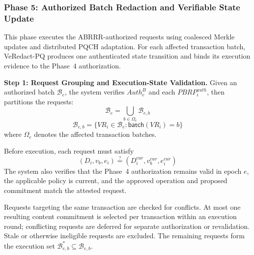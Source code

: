\documentclass[lettersize,journal]{IEEEtran}
\begin{document}
    
    
    
    \subsubsection*{\textbf{Phase 5: Authorized Batch Redaction
    and Verifiable State Update}}
    
    This phase executes the ABRRR-authorized requests
    using coalesced Merkle updates and distributed PQCH
    adaptation. For each affected transaction batch,
    VeRedact-PQ produces one authenticated state
    transition and binds its execution evidence to
    the Phase~4 authorization.
    
    \medskip
    \noindent\textbf{Step 1: Request Grouping and
    Execution-State Validation.}
    Given an authorized batch $\mathcal{B}_e$, the
    system verifies $Auth_e^B$ and each
    $PBRP_i^{auth}$, then partitions the requests:
    \begin{equation}
    \mathcal{B}_e=\bigcup_{b\in\Omega_e}\mathcal{B}_{e,b}
    \end{equation}
    \begin{equation}
    \mathcal{B}_{e,b}=\{VR_i\in\mathcal{B}_e:
    \mathsf{batch}(VR_i)=b\}
    \end{equation}
    where $\Omega_e$ denotes the affected transaction
    batches.
    
    Before execution, each request must satisfy
    \begin{equation}
    (D_i,v_b,e_i)
    \stackrel{?}{=}
    (D_i^{cur},v_b^{cur},e_i^{cur})
    \end{equation}
    The system also verifies that the Phase~4
    authorization remains valid in epoch $e$,
    the applicable policy is current, and the
    approved operation and proposed commitment
    match the attested request.
    
    Requests targeting the same transaction are
    checked for conflicts. At most one resulting
    content commitment is selected per transaction
    within an execution round; conflicting requests
    are deferred for separate authorization or
    revalidation. Stale or otherwise ineligible
    requests are excluded. The remaining requests
    form the execution set
    $\mathcal{B}_{e,b}^{*}\subseteq\mathcal{B}_{e,b}$.
    
\end{document}
